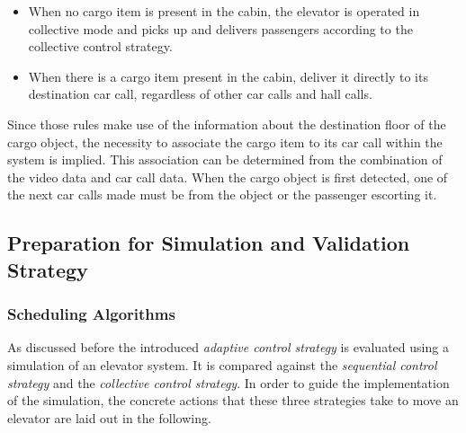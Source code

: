 \begin{itemize}
    \item When no cargo item is present in the cabin, the elevator is operated in collective mode and picks up and delivers passengers according to the collective control strategy.
    \item When there is a cargo item present in the cabin, deliver it directly to its destination car call, regardless of other car calls and hall calls.
\end{itemize}

Since those rules make use of the information about the destination floor of the cargo object, the necessity to associate the cargo item to its car call within the system is implied.
This association can be determined from the combination of the video data and car call data.
When the cargo object is first detected, one of the next car calls made must be from the object or the passenger escorting it.

\subsection{Preparation for Simulation and Validation Strategy}

\subsubsection{Scheduling Algorithms}
\label{sec:design:schedulingalgorithms}

As discussed before the introduced \emph{adaptive control strategy} is evaluated using a simulation of an elevator system. 
It is compared against the \emph{sequential control strategy} and the \emph{collective control strategy}.
In order to guide the implementation of the simulation, the concrete actions that these three strategies take to move an elevator are laid out in the following.

